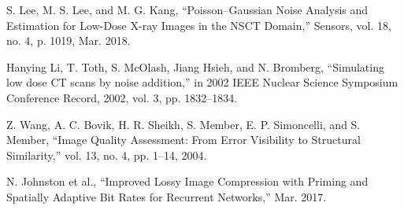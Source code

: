 \begin{thebibliography}{100}
 S. Lee, M. S. Lee, and M. G. Kang, “Poisson–Gaussian Noise Analysis and Estimation for Low-Dose X-ray Images in the NSCT Domain,” Sensors, vol. 18, no. 4, p. 1019, Mar. 2018.

 Hanying Li, T. Toth, S. McOlash, Jiang Hsieh, and N. Bromberg, “Simulating low dose CT scans by noise addition,” in 2002 IEEE Nuclear Science Symposium Conference Record, 2002, vol. 3, pp. 1832–1834.

 Z. Wang, A. C. Bovik, H. R. Sheikh, S. Member, E. P. Simoncelli, and S. Member, “Image Quality Assessment: From Error Visibility to Structural Similarity,” vol. 13, no. 4, pp. 1–14, 2004.

 N. Johnston et al., “Improved Lossy Image Compression with Priming and Spatially Adaptive Bit Rates for Recurrent Networks,” Mar. 2017.













\end{thebibliography}
